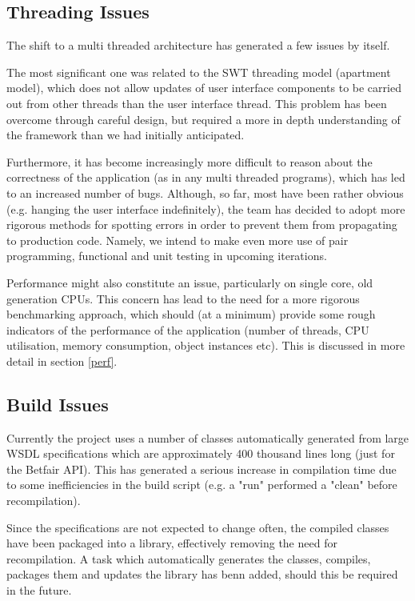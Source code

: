 \documentclass[10pt]{report}
\begin{document}
\subsection{Threading Issues}

The shift to a multi threaded architecture has generated a few issues by itself.

The most significant one was related to the SWT threading model (apartment model), which does not allow updates of user interface components to be carried out from other threads than the user interface thread. This problem has been overcome through careful design, but required a more in depth understanding of the framework than we had initially anticipated.

Furthermore, it has become increasingly more difficult to reason about the correctness of the application (as in any multi threaded programs), which has led to an increased number of bugs. Although, so far, most have been rather obvious (e.g. hanging the user interface indefinitely), the team has decided to adopt more rigorous methods for spotting errors in order to prevent them from propagating to production code.
Namely, we intend to make even more use of pair programming, functional and unit testing in upcoming iterations.

Performance might also constitute an issue, particularly on single core, old generation CPUs. This concern has lead to the need for a more rigorous benchmarking approach, which should (at a minimum) provide some rough indicators of the performance of the application (number of threads, CPU utilisation, memory consumption, object instances etc). This is discussed in more detail in section \ref{perf}.

\subsection{Build Issues}

Currently the project uses a number of classes automatically generated from large WSDL specifications which are approximately 400 thousand lines long (just for the Betfair API).
This has generated a serious increase in compilation time due to some inefficiencies in the build script (e.g. a "run" performed a "clean" before recompilation).

Since the specifications are not expected to change often, the compiled classes have been packaged into a library, effectively removing the need for recompilation.
A task which automatically generates the classes, compiles, packages them and updates the library has benn added, should this be required in the future.
\end{document}
